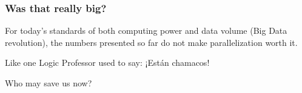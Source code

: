 \begin{frame}[plain]
	\frametitle{Was that really big?}
	\begin{block}{}
    For today's standards of both computing power and data volume (Big
    Data revolution), the numbers presented so far do not make
    parallelization worth it.
	\end{block} 
	\begin{block}{}
    Like one Logic Professor used to say: ¡Están chamacos!
	\end{block} 
	\begin{block}{}
    Who may save us now?
	\end{block} 
\end{frame}
